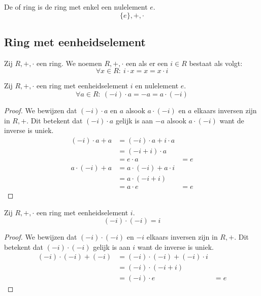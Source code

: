 \documentclass[main.tex]{subfiles}
\begin{document}
\begin{de}
  \label{de:nulring}
  De  of  ring is de ring met enkel een nulelement $e$.
  \[ \{ e \},+,\cdot \]
\end{de}

\subsection{Ring met eenheidselement}
\label{sec:ring-met-eenheidselement}

\begin{de}
  Zij $R,+,\cdot$ een ring.
  We noemen $R,+,\cdot$ een  als er een  $i\in R$ bestaat als volgt:
  \[ \forall x\in R:\ i\cdot x = x = x \cdot i \]
\end{de}

\begin{ei}
  Zij $R,+,\cdot$ een ring met eenheidselement $i$ en nulelement $e$.
  \[ \forall a \in R:\ (-i)\cdot a = -a = a \cdot (-i) \]

  \begin{proof}
    We bewijzen dat $(-i) \cdot a$ en $a$ alsook $a \cdot (-i)$ en $a$ elkaars inversen zijn in $R,+$.
    Dit betekent dat $(-i) \cdot a$ gelijk is aan $-a$ alsook $a\cdot (-i)$ want de inverse is uniek.
    \[
    \begin{array}{rll}
      (-i) \cdot a + a &= (-i) \cdot a + i \cdot a &\\
                       &= (-i + i) \cdot a &\\
                       &= e \cdot a &= e
    \end{array}
    \]
    \[
    \begin{array}{rll}
      a \cdot (-i) + a &= a \cdot (-i) + a \cdot i &\\
                       &= a \cdot (-i+i) &\\
                       &= a \cdot e &= e
    \end{array}
    \]
  \end{proof}
\end{ei}

\begin{ei}
  Zij $R,+,\cdot$ een ring met eenheidselement $i$.
  \[ (-i) \cdot (-i) = i\]
  \begin{proof}
    We bewijzen dat $(-i) \cdot (-i)$ en $-i$ elkaars inversen zijn in $R,+$.
    Dit betekent dat $(-i) \cdot (-i)$ gelijk is aan $i$ want de inverse is uniek.
    \[
    \begin{array}{rll}
      (-i) \cdot (-i) + (-i) &= (-i) \cdot (-i) + (-i) \cdot i &\\
                             &= (-i) \cdot (-i + i) &\\
                             &= (-i) \cdot e &= e
    \end{array}
    \]
  \end{proof}
\end{ei}
\end{document}
